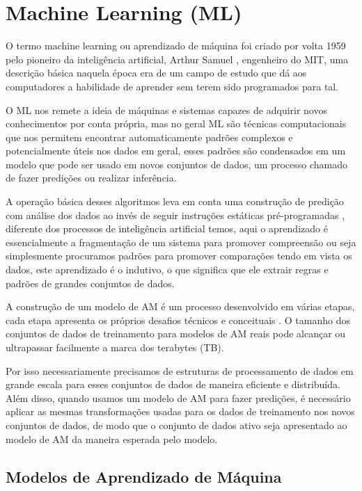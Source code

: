 \section{Machine Learning (ML)}\label{ml} 

O termo machine learning ou aprendizado de máquina foi criado por volta 1959 pelo pioneiro da inteligência artificial, Arthur Samuel \cite{150082}, engenheiro do MIT, uma descrição básica naquela época era de um campo de estudo que dá aos computadores a habilidade de aprender sem terem sido programados para tal. 

O ML nos remete a ideia de máquinas e sistemas capazes de adquirir novos conhecimentos por conta própria, mas no geral ML são técnicas computacionais que nos permitem encontrar automaticamente padrões complexos e potencialmente úteis nos dados em geral, esses padrões são condensados em um modelo que pode ser usado em novos conjuntos de dados, um processo chamado de fazer predições ou realizar inferência. 

A operação básica desses algoritmos leva em conta uma construção de predição com análise dos dados ao invés de seguir instruções estáticas pré-programadas \cite{astroml}, diferente dos processos de inteligência artificial temos, aqui o aprendizado é essencialmente a fragmentação de um sistema para promover compreensão ou seja simplesmente procuramos padrões para promover comparações tendo em vista os dados, este aprendizado é o indutivo, o que significa que ele extrair regras e padrões de grandes conjuntos de dados. 

A construção de um modelo de AM é um processo desenvolvido em várias etapas, cada etapa apresenta os próprios desafios técnicos e conceituais \cite{astroml}. O tamanho dos conjuntos de dados de treinamento para modelos de AM reais pode alcançar ou ultrapassar facilmente a marca dos terabytes (TB).  

Por isso necessariamente precisamos de estruturas de processamento de dados em grande escala para esses conjuntos de dados de maneira eficiente e distribuída. Além disso, quando usamos um modelo de AM para fazer predições, é necessário aplicar as mesmas transformações usadas para os dados de treinamento nos novos conjuntos de dados, de modo que o conjunto de dados ativo seja apresentado ao modelo de AM da maneira esperada pelo modelo. 

\subsection{Modelos de Aprendizado de Máquina} 

